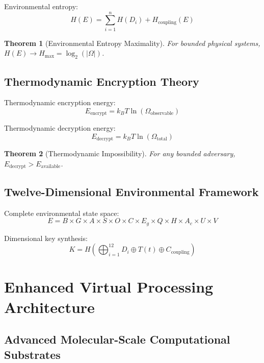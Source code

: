 \documentclass[12pt,a4paper]{article}
\newtheorem{theorem}{Theorem}[section]
\begin{document}
Environmental entropy:
\begin{equation}
H(E) = \sum_{i=1}^n H(D_i) + H_{\text{coupling}}(E)
\end{equation}

\begin{theorem}[Environmental Entropy Maximality]
For bounded physical systems, $H(E) \to H_{\max} = \log_2(|\Omega|)$.
\end{theorem}

\subsection{Thermodynamic Encryption Theory}

Thermodynamic encryption energy:
\begin{equation}
E_{\text{encrypt}} = k_B T \ln(\Omega_{\text{observable}})
\end{equation}

Thermodynamic decryption energy:
\begin{equation}
E_{\text{decrypt}} = k_B T \ln(\Omega_{\text{total}})
\end{equation}

\begin{theorem}[Thermodynamic Impossibility]
For any bounded adversary, $E_{\text{decrypt}} > E_{\text{available}}$.
\end{theorem}

\subsection{Twelve-Dimensional Environmental Framework}

Complete environmental state space:
\begin{equation}
E = B \times G \times A \times S \times O \times C \times E_g \times Q \times H \times A_c \times U \times V
\end{equation}

Dimensional key synthesis:
\begin{equation}
K = H\left(\bigoplus_{i=1}^{12} D_i \oplus T(t) \oplus C_{\text{coupling}}\right)
\end{equation}

\section{Enhanced Virtual Processing Architecture}

\subsection{Advanced Molecular-Scale Computational Substrates}
\end{document}
